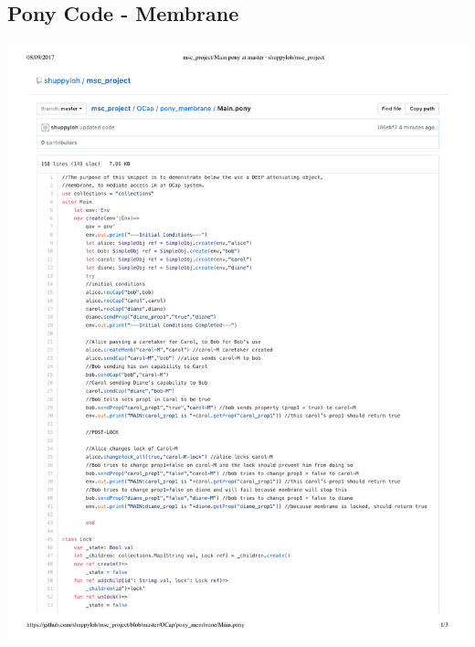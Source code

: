 \documentclass[a4paper,11pt,twoside]{article}
\begin{document}
{\subsection{Pony Code - Membrane}\label{sec:code_Membrane}
\begin{minipage}{\textwidth}
\includegraphics[width=\textwidth,valign=t,page=1]{figures/code_Membrane.pdf}
\end{minipage}
\begin{minipage}{\textwidth}

\end{minipage}}
\end{document}
